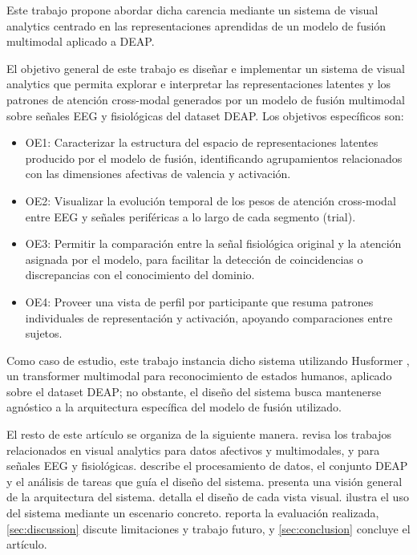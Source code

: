 Este trabajo propone abordar dicha carencia mediante un sistema de visual analytics centrado en las representaciones aprendidas de un modelo de fusión multimodal aplicado a DEAP.

El objetivo general de este trabajo es diseñar e implementar un sistema de visual analytics que permita explorar e interpretar las representaciones latentes y los patrones de atención cross-modal generados por un modelo de fusión multimodal sobre señales EEG y fisiológicas del dataset DEAP. Los objetivos específicos son:

\begin{itemize}
    \item OE1: Caracterizar la estructura del espacio de representaciones latentes producido por el modelo de fusión, identificando agrupamientos relacionados con las dimensiones afectivas de valencia y activación.
    \item OE2: Visualizar la evolución temporal de los pesos de atención cross-modal entre EEG y señales periféricas a lo largo de cada segmento (trial).
    \item OE3: Permitir la comparación entre la señal fisiológica original y la atención asignada por el modelo, para facilitar la detección de coincidencias o discrepancias con el conocimiento del dominio.
    \item OE4: Proveer una vista de perfil por participante que resuma patrones individuales de representación y activación, apoyando comparaciones entre sujetos.
\end{itemize}

Como caso de estudio, este trabajo instancia dicho sistema utilizando Husformer \cite{wang2022husformer}, un transformer multimodal para reconocimiento de estados humanos, aplicado sobre el dataset DEAP; no obstante, el diseño del sistema busca mantenerse agnóstico a la arquitectura específica del modelo de fusión utilizado.

El resto de este artículo se organiza de la siguiente manera.  revisa los trabajos relacionados en visual analytics para datos afectivos y multimodales, y para señales EEG y fisiológicas.  describe el procesamiento de datos, el conjunto DEAP y el análisis de tareas que guía el diseño del sistema.  presenta una visión general de la arquitectura del sistema.  detalla el diseño de cada vista visual.  ilustra el uso del sistema mediante un escenario concreto.  reporta la evaluación realizada, \cref{sec:discussion} discute limitaciones y trabajo futuro, y \cref{sec:conclusion} concluye el artículo.